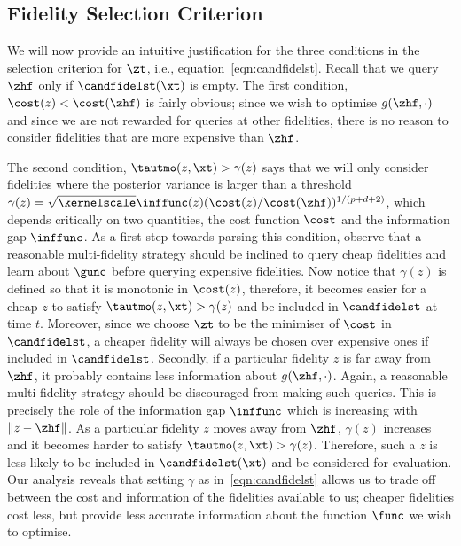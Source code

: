 \insertAlgoMFGPUCBTwo

\subsection{Fidelity Selection Criterion}
\label{sec:fidelSelection}

We will now provide an intuitive justification for the three conditions in the
 selection criterion for $\zt$, i.e., equation~\eqref{eqn:candfidelst}.
Recall that we query $\zhf$ only if $\candfidelst(\xt)$ is empty.
The first condition, $\cost(z) < \cost(\zhf)$ is fairly obvious;
since we wish to optimise $g(\zhf, \cdot)$ and since we are not rewarded for queries at
other fidelities, there
is no reason to consider fidelities that are more expensive than $\zhf$. 

The second condition, $\tautmo(z,\xt) > \gamma(z)$ says that we will only consider
fidelities where the posterior
variance is larger than a threshold
$\gamma(z) = \sqrt{\kernelscale}\inffunc(z)(\cost(z)/\cost(\zhf))^{1/(p+d+2)}$,
 which depends critically on two
quantities, the cost function $\cost$ and the information gap $\inffunc$. As a first step towards parsing this condition, observe that a reasonable multi-fidelity strategy should be inclined to query cheap
fidelities and learn about $\gunc$ before querying expensive fidelities. Now notice that $\gamma(z)$ is defined so that it is monotonic in $\cost(z)$, therefore, it becomes
easier for a cheap $z$ to satisfy $\tautmo(z,\xt)>\gamma(z)$ and be included in
$\candfidelst$ at time $t$. Moreover, since we choose $\zt$ to be the minimiser of $\cost$ in $\candfidelst$,
a cheaper fidelity will always be chosen over expensive ones if included in $\candfidelst$. 
Secondly, if a particular fidelity $z$ is far away from $\zhf$, it probably contains less information
about $g(\zhf,\cdot)$. Again, a reasonable multi-fidelity strategy should be discouraged from making such queries. 
This is precisely the role of the information gap $\inffunc$ which is increasing with
$\|z-\zhf\|$.
As a particular fidelity $z$ moves away from $\zhf$, $\gamma(z)$ increases and
it becomes harder to satisfy $\tautmo(z,\xt)>\gamma(z)$.
Therefore, such a $z$ is less likely
to be included in $\candfidelst(\xt)$ and be considered for evaluation.
Our analysis reveals that setting $\gamma$ as in~\eqref{eqn:candfidelst} allows us to trade off between the cost and information of the fidelities available to us; 
cheaper fidelities cost less, but provide less accurate information about the
function $\func$ we wish to optimise.

